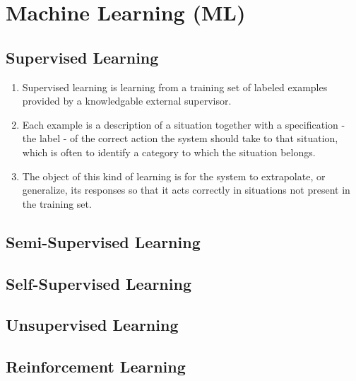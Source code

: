 \chapter{Machine Learning (ML)}

\section{Supervised Learning}\label{Supervised Learning}

\begin{enumerate}
    \item Supervised learning is learning from a training set of labeled examples provided by a knowledgable external supervisor. \cite{drl-1}

    \item Each example is a description of a situation together with a specification - the label - of the correct action the system should take to that situation, which is often to identify a category to which the situation belongs. \cite{drl-1}
    
    \item The object of this kind of learning is for the system to extrapolate, or generalize, its responses so that it acts correctly in situations not present in the training set. \cite{drl-1}

    
\end{enumerate}

\section{Semi-Supervised Learning}\label{Semi-Supervised Learning}

\section{Self-Supervised Learning}\label{Self-Supervised Learning}

\section{Unsupervised Learning}\label{Unsupervised Learning}

\section{Reinforcement Learning \cite{drl-1}} \label{Reinforcement Learning}

